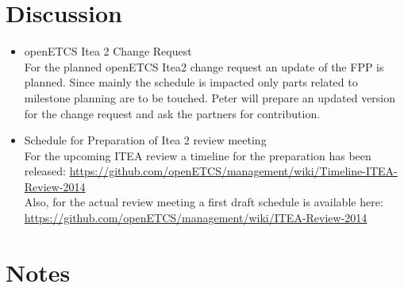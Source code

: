 \documentclass[a4paper, 11pt]{article}
\begin{document}
\section{Discussion}
\begin{itemize}
\item openETCS Itea 2 Change Request\\
For the planned openETCS Itea2 change request an update of the FPP is planned. Since mainly the schedule is impacted only parts related to milestone planning are to be touched. Peter will prepare an updated version for the change request and ask the partners for contribution.

\item Schedule for Preparation of Itea 2 review meeting\\
For the upcoming ITEA review a timeline for the preparation has been released:
\url{https://github.com/openETCS/management/wiki/Timeline-ITEA-Review-2014}\\

Also, for the actual review meeting a first draft schedule is available here: \url{https://github.com/openETCS/management/wiki/ITEA-Review-2014}

\end{itemize}

\section{Notes}
\end{document}
